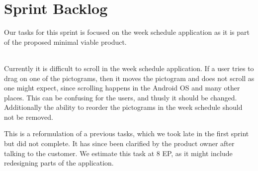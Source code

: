 \section{Sprint Backlog}\label{plan2}
Our tasks for this sprint is focused on the week schedule application as it is part of the proposed minimal viable product. 
\begin{description}[style=unboxed]
    \item[{[}\phigh{]} Week Schedule -- Long Schedules] \hfill \\ 
    Currently it is difficult to scroll in the week schedule application.
    If a user tries to drag on one of the pictograms, then it moves the pictogram and does not scroll as one might expect, since scrolling happens in the Android OS and many other places. 
    This can be confusing for the users, and thusly it should be changed. 
    Additionally the ability to reorder the pictograms in the week schedule should not be removed. 

    This is a reformulation of a previous tasks, which we took late in the first sprint but did not complete. 
    It has since been clarified by the product owner after talking to the customer. 
    We estimate this task at 8 EP, as it might include redesigning parts of the application. 
    \item[{[}\phigh{]} Week Schedule -- Offline Usage] \hfill \\ 

    \item[{[}\phigh{]} Week Schedule -- Clear Progress] \hfill \\ 


\end{description}
